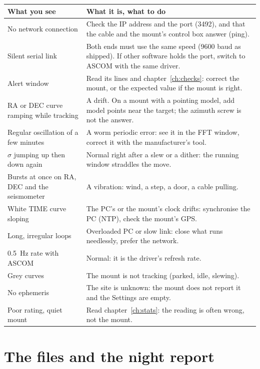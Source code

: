 \begin{center}
\begin{tabularx}{\textwidth}{p{4cm}X}
\toprule
\textbf{What you see} & \textbf{What it is, what to do} \\
\midrule
No network connection & Check the IP address and the port (3492), and that the
cable and the mount's control box answer (ping). \\
Silent serial link & Both ends must use the same speed (9600 baud as shipped).
If other software holds the port, switch to ASCOM with the same driver. \\
Alert window & Read its lines and chapter~\ref{ch:checks}: correct the mount,
or the expected value if the mount is right. \\
RA or DEC curve ramping while tracking & A drift. On a mount with a pointing
model, add model points near the target; the azimuth screw is not the
answer. \\
Regular oscillation of a few minutes & A worm periodic error: see it in the
FFT window, correct it with the manufacturer's tool. \\
$\sigma$ jumping up then down again & Normal right after a slew or a dither: the
running window straddles the move. \\
Bursts at once on RA, DEC and the seismometer & A vibration: wind, a step, a
door, a cable pulling. \\
White TIME curve sloping & The PC's or the mount's clock drifts: synchronise
the PC (NTP), check the mount's GPS. \\
Long, irregular loops & Overloaded PC or slow link: close what runs needlessly,
prefer the network. \\
0.5~Hz rate with ASCOM & Normal: it is the driver's refresh rate. \\
Grey curves & The mount is not tracking (parked, idle, slewing). \\
No ephemeris & The site is unknown: the mount does not report it and the
Settings are empty. \\
Poor rating, quiet mount & Read chapter~\ref{ch:stats}: the reading is often
wrong, not the mount. \\
\bottomrule
\end{tabularx}
\end{center}

\chapter{The files and the night report}
\label{ch:files}

